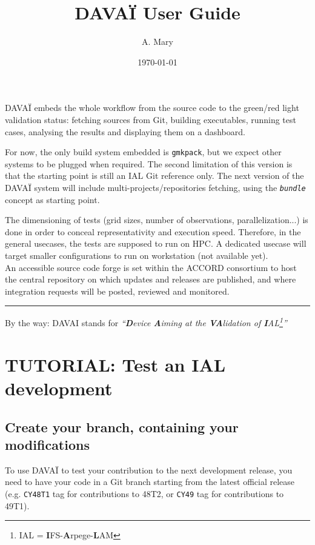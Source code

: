 \documentclass[a4paper,10pt,twoside]{article}
\title{DAVAÏ User Guide}
\author{A. Mary}
\date{\today}
\begin{document}
\maketitle

\tableofcontents
\vspace{1cm}
\newpage


DAVAÏ embeds the whole workflow from the source code to the green/red light validation status: fetching sources from Git, building executables, running test cases, analysing the results and displaying them on a dashboard.

For now, the only build system embedded is \texttt{gmkpack}, but we expect other systems to be plugged when required. The second limitation of this version is that the starting point is still an IAL Git reference only. The next version of the DAVAÏ system will include multi-projects/repositories fetching, using the \textit{\texttt{bundle}} concept as starting point.

The dimensioning of tests (grid sizes, number of observations, parallelization...) is done in order to conceal representativity and execution speed. Therefore, in the general usecases, the tests are supposed to run on HPC. A dedicated usecase will target smaller configurations to run on workstation (not available yet).\\

An accessible source code forge is set within the ACCORD consortium to host the central repository on which updates and releases are published, and where integration requests will be posted, reviewed and monitored.
\begin{center}
 \rule{8cm}{1pt}
\end{center}

By the way: DAVAI stands for \textit{``\textbf{D}evice \textbf{A}iming at the \textbf{VA}lidation of \textbf{I}AL\footnote{IAL = \textbf{I}FS-\textbf{A}rpege-\textbf{L}AM}''}

\newpage
\section{TUTORIAL: Test an IAL development} 
\subsection{Create your branch, containing your modifications}
To use DAVAÏ to test your contribution to the next development release, you need to have your code in a Git branch starting from the latest official release (e.g. \texttt{CY48T1} tag for contributions to 48T2, or \texttt{CY49} tag for contributions to 49T1).
\end{document}
